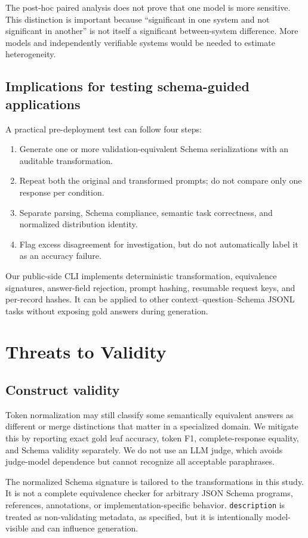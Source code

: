 \documentclass[10pt]{article}
\begin{document}
The post-hoc paired analysis does not prove that one model is more sensitive. This distinction is important because ``significant in one system and not significant in another'' is not itself a significant between-system difference. More models and independently verifiable systems would be needed to estimate heterogeneity.

\subsection{Implications for testing schema-guided applications}
A practical pre-deployment test can follow four steps:

\begin{enumerate}
\item Generate one or more validation-equivalent Schema serializations with an auditable transformation.
\item Repeat both the original and transformed prompts; do not compare only one response per condition.
\item Separate parsing, Schema compliance, semantic task correctness, and normalized distribution identity.
\item Flag excess disagreement for investigation, but do not automatically label it as an accuracy failure.
\end{enumerate}
Our public-side CLI implements deterministic transformation, equivalence signatures, answer-field rejection, prompt hashing, resumable request keys, and per-record hashes. It can be applied to other context--question--Schema JSONL tasks without exposing gold answers during generation.

\section{Threats to Validity}
\subsection{Construct validity}
Token normalization may still classify some semantically equivalent answers as different or merge distinctions that matter in a specialized domain. We mitigate this by reporting exact gold leaf accuracy, token F1, complete-response equality, and Schema validity separately. We do not use an LLM judge, which avoids judge-model dependence but cannot recognize all acceptable paraphrases.

The normalized Schema signature is tailored to the transformations in this study. It is not a complete equivalence checker for arbitrary JSON Schema programs, references, annotations, or implementation-specific behavior. \texttt{description} is treated as non-validating metadata, as specified, but it is intentionally model-visible and can influence generation.
\end{document}
